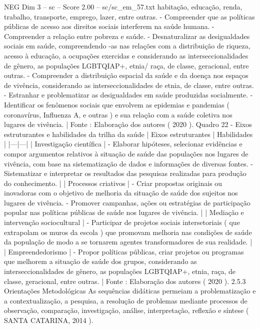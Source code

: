 \begin{textsample}{NEG Dim 3 – sc – Score 2.00 – sc/sc\_em\_57.txt}
habitação, educação, renda, trabalho, transporte, emprego, lazer, entre outras. - Compreender que as políticas públicas de acesso aos direitos sociais interferem na saúde humana. - Compreender a relação entre pobreza e saúde. - Desnaturalizar as desigualdades sociais em saúde, compreendendo -as nas relações com a distribuição de riqueza, acesso à educação, a ocupações exercidas e considerando as interseccionalidades de gênero, as populações LGBTQIAP+, etnia/ raça, de classe, geracional, entre outras. - Compreender a distribuição espacial da saúde e da doença nos espaços de vivência, considerando as interseccionalidades de etnia, de classe, entre outras. - Estranhar e problematizar as desigualdades em saúde produzidas socialmente. - Identificar os fenômenos sociais que envolvem as epidemias e pandemias ( coronavírus, Influenza A, e outras ) e sua relação com a saúde coletiva nos lugares de vivência. | Fonte : Elaboração dos autores ( 2020 ).
Quadro 22 - Eixos estruturantes e habilidades da trilha da saúde | Eixos estruturantes | Habilidades | |---|---| | Investigação científica | - Elaborar hipóteses, selecionar evidências e compor argumentos relativos à situação de saúde das populações nos lugares de vivência, com base na sistematização de dados e informações de diversas fontes. - Sistematizar e interpretar os resultados das pesquisas realizadas para produção do conhecimento. | | Processos criativos | - Criar propostas originais ou inovadoras com o objetivo de melhoria da situação de saúde dos sujeitos nos lugares de vivência. - Promover campanhas, ações ou estratégias de participação popular nas políticas públicas de saúde nos lugares de vivência. | | Mediação e intervenção sociocultural | - Participar de projetos sociais intersetoriais ( que extrapolam os muros da escola ) que promovam melhoria nas condições de saúde da população de modo a se tornarem agentes transformadores de sua realidade. | | Empreendedorismo | - Propor políticas públicas, criar projetos ou programas que melhorem a situação de saúde dos grupos, considerando as interseccionalidades de gênero, as populações LGBTQIAP+, etnia, raça, de classe, geracional, entre outras. | Fonte : Elaboração dos autores ( 2020 ). 2.5.3 Orientações Metodológicas As sequências didáticas permeiam a problematização e a contextualização, a pesquisa, a resolução de problemas mediante processos de observação, comparação, investigação, análise, interpretação, reflexão e síntese ( SANTA CATARINA, 2014 ).

\end{textsample}
